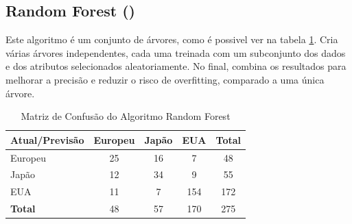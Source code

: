 \documentclass[conference]{IEEEtran}
\begin{document}
\subsection{Random Forest (\cite{forest})}
Este algoritmo é um conjunto de árvores, como é possivel ver na tabela \ref{tab:conf_matrix_forest}. Cria várias árvores
independentes, cada uma treinada com um subconjunto dos dados e dos atributos selecionados aleatoriamente. No final,
combina os resultados para melhorar a precisão e reduzir o risco de overfitting, comparado a uma única árvore.
\begin{table}[!ht]
	\centering
	\begin{tabular}{lcccc}
		\toprule
		\textbf{Atual/Previsão} & \textbf{Europeu} & \textbf{Japão} & \textbf{EUA} & \textbf{Total} \\
		\midrule
		Europeu                 & 25               & 16             & 7            & 48             \\
		Japão                   & 12               & 34             & 9            & 55             \\
		EUA                     & 11               & 7              & 154          & 172            \\
		\midrule
		\textbf{Total}          & 48               & 57             & 170          & 275            \\
		\bottomrule
	\end{tabular}
	\caption{Matriz de Confusão do Algoritmo Random Forest}
	\label{tab:conf_matrix_forest}

\end{table}
\newline

\end{document}
